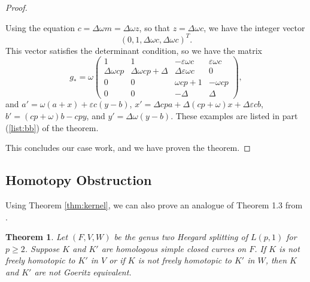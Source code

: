 \documentclass{amsart}     %
\newtheorem{thm}{Theorem}[section]    %
\theoremstyle{definition}
\begin{document}
\begin{proof}
\begin{enumerate}
Using the equation $c = \Delta \omega m = \Delta \omega z$, so that $z = \Delta \omega c$, we have the integer vector $$(0,1, \Delta\omega c, \Delta\omega c)^T.$$ 
This vector satisfies the determinant condition, so we have the matrix \[g_* =  \omega \begin{pmatrix}  1 & 1 & -\varepsilon \omega  c & \varepsilon \omega c \\
\Delta \omega cp & \Delta \omega cp + \Delta &  \Delta \varepsilon\omega  c & 0 \\ 
0 & 0 & \omega cp + 1 & -\omega cp \\ 
0 & 0 & -\Delta  & \Delta \end{pmatrix},\]
%
and $a' = \omega (a + x) + \varepsilon c (y-b)$, $x ' = \Delta cp a + \Delta (cp + \omega ) x + \Delta \varepsilon c b $, $b' = (cp+\omega ) b - cp y$, and $y' = \Delta\omega (y-b)$. These examples are listed in part (\ref{list:bb}) of the theorem.


\end{enumerate}

This concludes our case work, and we have proven the theorem.
\end{proof}

\subsection{Homotopy Obstruction}
\label{subsection:HomotopyObstruction}

Using Theorem \ref{thm:kernel}, we can also prove an analogue of Theorem 1.3 from \cite{DolRatG2GES3}.

\begin{thm} 
\label{thm:HomotopyObstruction} Let $(F, V, W)$ be the genus two Heegard splitting of $L(p, 1)$ for $p \geq 2$. Suppose $K$ and $K'$ are homologous simple closed curves on $F$. If $K$ is not freely homotopic to $K'$ in $V$ or if $K$ is not freely homotopic to $K'$ in $W$, then $K$ and $K'$ are not Goeritz equivalent.
\end{thm}
\end{document}
